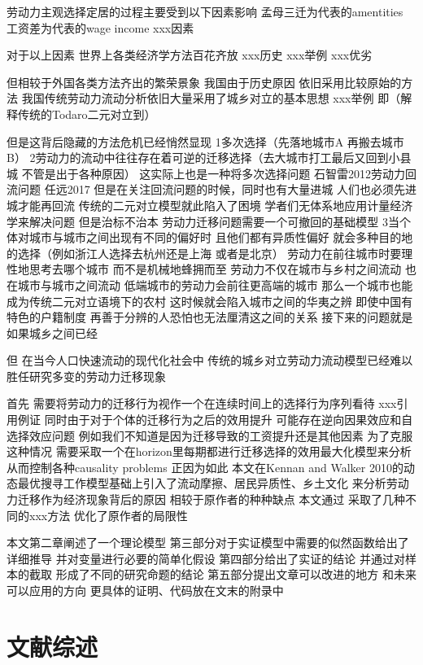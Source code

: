 \documentclass{article}
\numberwithin{equation}{section} %
\begin{document}
劳动力主观选择定居的过程主要受到以下因素影响
孟母三迁为代表的amentities
工资差为代表的wage income
xxx因素

对于以上因素
世界上各类经济学方法百花齐放
xxx历史
xxx举例
xxx优劣

但相较于外国各类方法齐出的繁荣景象
我国由于历史原因
依旧采用比较原始的方法
我国传统劳动力流动分析依旧大量采用了城乡对立的基本思想
xxx举例
即（解释传统的Todaro二元对立到）

但是这背后隐藏的方法危机已经悄然显现
1多次选择（先落地城市A 再搬去城市B）
2劳动力的流动中往往存在着可逆的迁移选择（去大城市打工最后又回到小县城 不管是出于各种原因） 这实际上也是一种将多次选择问题 
石智雷2012劳动力回流问题
任远2017
但是在关注回流问题的时候，同时也有大量进城
人们也必须先进城才能再回流
传统的二元对立模型就此陷入了困境 学者们无体系地应用计量经济学来解决问题 但是治标不治本
劳动力迁移问题需要一个可撤回的基础模型
3当个体对城市与城市之间出现有不同的偏好时 且他们都有异质性偏好 就会多种目的地的选择（例如浙江人选择去杭州还是上海 或者是北京）
劳动力在前往城市时要理性地思考去哪个城市 而不是机械地蜂拥而至
劳动力不仅在城市与乡村之间流动 也在城市与城市之间流动
低端城市的劳动力会前往更高端的城市 那么一个城市也能成为传统二元对立语境下的农村 这时候就会陷入城市之间的华夷之辨 即使中国有特色的户籍制度 再善于分辨的人恐怕也无法厘清这之间的关系 接下来的问题就是如果城乡之间已经

但
在当今人口快速流动的现代化社会中
传统的城乡对立劳动力流动模型已经难以胜任研究多变的劳动力迁移现象

首先
需要将劳动力的迁移行为视作一个在连续时间上的选择行为序列看待
xxx引用例证
同时由于对于个体的迁移行为之后的效用提升
可能存在逆向因果效应和自选择效应问题
例如我们不知道是因为迁移导致的工资提升还是其他因素
为了克服这种情况
需要采取一个在horizon里每期都进行迁移选择的效用最大化模型来分析
从而控制各种causality problems
正因为如此
本文在Kennan and Walker 2010的动态最优搜寻工作模型基础上引入了流动摩擦、居民异质性、乡土文化
来分析劳动力迁移作为经济现象背后的原因
相较于原作者的种种缺点
本文通过
采取了几种不同的xxx方法
优化了原作者的局限性

本文第二章阐述了一个理论模型
第三部分对于实证模型中需要的似然函数给出了详细推导 并对变量进行必要的简单化假设
第四部分给出了实证的结论 并通过对样本的截取 形成了不同的研究命题的结论
第五部分提出文章可以改进的地方 和未来可以应用的方向
更具体的证明、代码放在文末的附录中




\section{文献综述}
\end{document}
